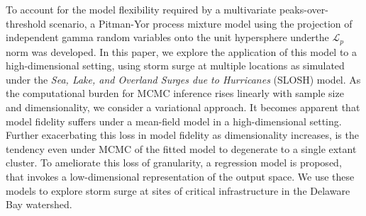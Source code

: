     
To account for the model flexibility required by a multivariate peaks-over-threshold
    scenario, a Pitman-Yor process mixture model using the projection of independent 
    gamma random variables onto the unit hypersphere underthe $\mathcal{L}_p$ norm was 
    developed.  In this paper, we explore the application of this model to a
    high-dimensional setting, using storm surge at multiple locations as simulated 
    under the \emph{Sea, Lake, and Overland Surges due to Hurricanes} (SLOSH) model.
    As the computational burden for MCMC inference rises linearly with sample size 
    and dimensionality, we consider a variational approach.  It becomes apparent that
    model fidelity suffers under a mean-field model in a high-dimensional setting.
    Further exacerbating this loss in model fidelity as dimensionality increases, is
    the tendency even under MCMC of the fitted model to degenerate to a single extant 
    cluster.  To ameliorate this loss of granularity, a regression model is proposed, 
    that invokes a low-dimensional representation of the output space.  We use these
    models to explore storm surge at sites of critical infrastructure in the Delaware 
    Bay watershed.


